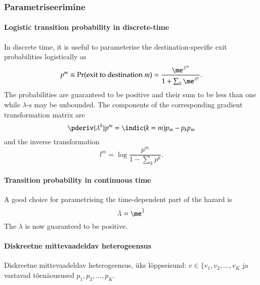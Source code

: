 \documentclass[a4paper]{article}
\numberwithin{equation}{subsection}
\begin{document}
\clearpage
\subsubsection{Parametriseerimine}

\paragraph{Logistic transition probability in discrete-time}
In discrete time, it is useful to parameterise the
destination-specific exit probabilities logistically as
\begin{equation}
  p^m \equiv \Pr(\text{exit to destination $m$}) = 
  \frac{\me^{\lambda^m}}{1 + \sum_k \me^{\lambda^k}}.
\end{equation}
The probabilities are guaranteed to be positive and their sum to be
less than one while $\lambda$-s may be unbounded.  The components of
the corresponding gradient transformation matrix are
\begin{equation}
  \pderiv{\lambda^k} p^m =
  \indic(k = m) p_m - p_k p_m
\end{equation}
and the inverse transformation
\begin{equation}
  l^m = \log \frac{p^m}{1 - \sum_k p^k}.
\end{equation}



\paragraph{Transition probability in continuous time}
A good choice for parametrising the time-dependent part of the hazard
is
\begin{equation}
  \lambda = \me^{\tilde \lambda}
\end{equation}
The $\lambda$ is now guaranteed to be positive.


\paragraph{Diskreetne mittevaadeldav heterogeensus}
Diskreetne mittevaadeldav heterogeensus, üks lõppseisund: $v \in
\{v_1, v_2,\dots,v_K$ ja vastavad tõenäousused $p_1, p_2, \dots,
p_K$.  
\end{document}
